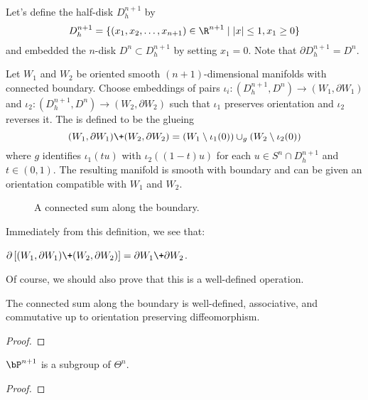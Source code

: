 Let's define the half-disk $D_h^{n+1}$ by
\[
	D_h^{n+1} = \{ (x_1,x_2,\ldots, x_{n+1})\in\R^{n+1} \mid |x|\leq 1, x_1\geq 0\}
\]
and embedded the $n$-disk $D^n\subset D_h^{n+1}$ by setting $x_1=0$. Note that $\partial D_h^{n+1}= D^n$.
\begin{definition}
	Let $W_1$ and $W_2$ be oriented smooth $(n+1)$-dimensional manifolds with connected boundary. Choose embeddings of pairs $\iota_i : (D_h^{n+1},D^n)  \to (W_1,\partial W_1)$ and $\iota_2 : (D_h^{n+1}, D^n) \to (W_2, \partial W_2)$ such that $\iota_1$ preserves orientation and $\iota_2$ reverses it. The  is defined to be the glueing
	\[
		(W_1,\partial W_1)\+(W_2,\partial W_2) = (W_1\setminus \iota_1(0))\cup_g (W_2\setminus \iota_2(0))
	\]
	where $g$ identifies $\iota_1(tu)$ with $\iota_2((1-t)u)$ for each $u\in S^n\cap D_h^{n+1}$ and $t\in (0,1)$. The resulting manifold is smooth with boundary and can be given an orientation compatible with $W_1$ and $W_2$.
\end{definition}

\begin{figure}[ht]
	\centering
	\medskip
	\caption{A connected sum along the boundary.}
\end{figure}

Immediately from this definition, we see that:
\begin{proposition} $\partial\left[(W_1,\partial W_1)\+ (W_2,\partial W_2)\right] = \partial W_1\+\partial W_2$.
\end{proposition}

Of course, we should also prove that this is a well-defined operation.

\begin{proposition}
	The connected sum along the boundary is well-defined, associative, and commutative up to orientation preserving diffeomorphism.
\end{proposition}
\begin{proof}
\end{proof}

\begin{proposition}
	$\bP^{n+1}$ is a subgroup of $\Theta^n$.
\end{proposition}
\begin{proof}
\end{proof}


